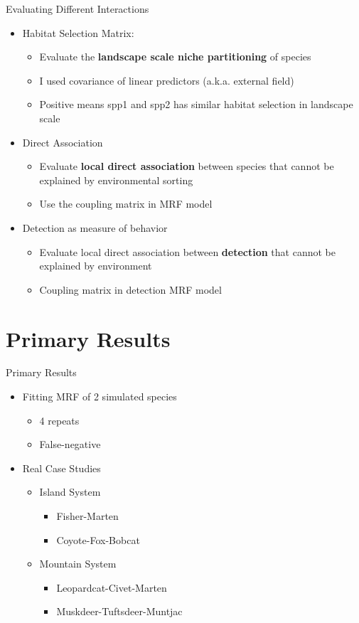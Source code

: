 \documentclass{beamer}
\begin{document}
\begin{frame}{Evaluating Different Interactions}
\begin{itemize}
	\item Habitat Selection Matrix:
	\begin{itemize}
		\item Evaluate the \textbf{landscape scale niche partitioning} of species
		\item I used covariance of linear predictors (a.k.a. external field)
		\item Positive means spp1 and spp2 has similar habitat selection in landscape scale
	\end{itemize}
	\pause
	\item Direct Association
	\begin{itemize}
		\item Evaluate \textbf{local direct association} between species that cannot be explained by environmental sorting
		\item Use the coupling matrix in MRF model
	\end{itemize}
	\pause
	\item Detection as measure of behavior
	\begin{itemize}
		\item Evaluate local direct association between \textbf{detection} that cannot be explained by environment
		\item Coupling matrix in detection MRF model
	\end{itemize}
\end{itemize}

\end{frame}

\section{Primary Results}
\begin{frame}{Primary Results}
	\begin{itemize}
		\item Fitting MRF of 2 simulated species
		\begin{itemize}
			\item 4 repeats
			\item False-negative
		\end{itemize}
		\item Real Case Studies
		\begin{itemize}
			\item Island System
			\begin{itemize}
				\item Fisher-Marten
				\item Coyote-Fox-Bobcat
			\end{itemize}
			
			\item Mountain System
			\begin{itemize}
				\item Leopardcat-Civet-Marten
				\item Muskdeer-Tuftsdeer-Muntjac 
			\end{itemize}
			
		\end{itemize}
	\end{itemize}
\end{frame}
\end{document}

